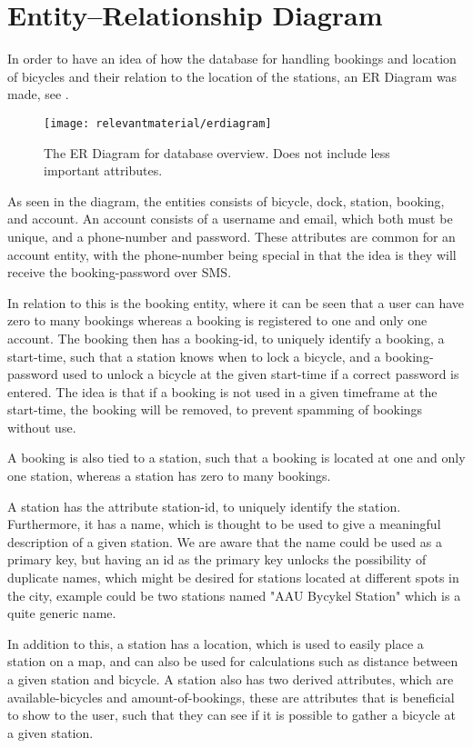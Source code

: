 \section{Entity--Relationship Diagram}
In order to have an idea of how the database for handling bookings and location of bicycles and their relation to the location of the stations, an ER Diagram was made, see .

\begin{figure}
	\centering
	\texttt{[image: relevantmaterial/erdiagram]}
	\caption{The ER Diagram for database overview. Does not include less important attributes.}\label{fig:er-dia}
\end{figure}

As seen in the diagram, the entities consists of bicycle, dock, station, booking, and account.
An account consists of a username and email, which both must be unique, and a phone-number and password.
These attributes are common for an account entity, with the phone-number being special in that the idea is they will receive the booking-password over SMS.

In relation to this is the booking entity, where it can be seen that a user can have zero to many bookings whereas a booking is registered to one and only one account.
The booking then has a booking-id, to uniquely identify a booking, a start-time, such that a station knows when to lock a bicycle, and a booking-password used to unlock a bicycle at the given start-time if a correct password is entered.
The idea is that if a booking is not used in a given timeframe at the start-time, the booking will be removed, to prevent spamming of bookings without use.

A booking is also tied to a station, such that a booking is located at one and only one station, whereas a station has zero to many bookings.

A station has the attribute station-id, to uniquely identify the station.
Furthermore, it has a name, which is thought to be used to give a meaningful description of a given station.
We are aware that the name could be used as a primary key, but having an id as the primary key unlocks the possibility of duplicate names, which might be desired for stations located at different spots in the city, example could be two stations named "AAU Bycykel Station" which is a quite generic name.

In addition to this, a station has a location, which is used to easily place a station on a map, and can also be used for calculations such as distance between a given station and bicycle.
A station also has two derived attributes, which are available-bicycles and amount-of-bookings, these are attributes that is beneficial to show to the user, such that they can see if it is possible to gather a bicycle at a given station.

